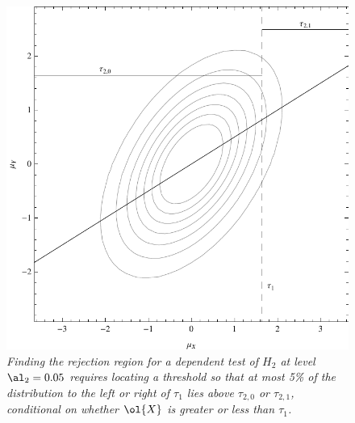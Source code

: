 \documentclass[12pt]{article}
\begin{document}
\clearpage


\begin{figure}
\caption{\sl Finding the rejection region for a dependent test of $H_2$ at level
 $\al_2 = 0.05$ requires locating a threshold so that at most 5\% of the
 distribution to the left or right of $\tau_1$ lies above $\tau_{2,0}$ or
 $\tau_{2,1}$, conditional on whether $\ol{X}$ is greater or less than
 $\tau_1$. }
 \label{fi:biv}
 \vspace{.5in}
 \centerline{ \includegraphics[width=4.5in]{figure1} }
        
\end{figure}


\clearpage
\end{document}
